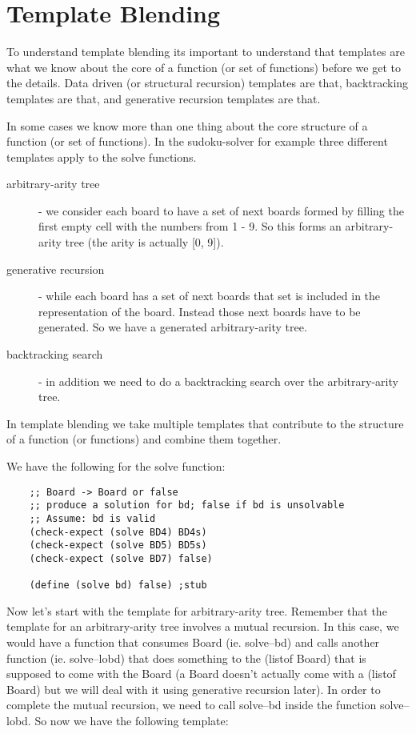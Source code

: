 \documentclass[11pt,a4paper]{report}
\begin{document}
	\chapter{Template Blending} \label{ch:temp_blend}
	To understand template blending its important to understand that templates are what we know
	about the core of a function (or set of functions) before we get to the details. Data driven (or
	structural recursion) templates are that, backtracking templates are that, and generative recursion
	templates are that.
	
	In some cases we know more than one thing about the core structure of a function (or set of
	functions). In the sudoku-solver for example three different templates apply to the solve
	functions.
	\begin{description}
		\item[arbitrary-arity tree] - we consider each board to have a set of next boards formed by filling the
		first empty cell with the numbers from 1 - 9. So this forms an arbitrary-arity tree (the arity is
		actually [0, 9]).
		\item[generative recursion] - while each board has a set of next boards that set is included in the
		representation of the board. Instead those next boards have to be generated. So we have a
		generated arbitrary-arity tree.
		\item[backtracking search] - in addition we need to do a backtracking search over the arbitrary-arity
		tree.
	\end{description}

	In template blending we take multiple templates that contribute to the structure of a function (or
	functions) and combine them together.
	
	We have the following for the solve function:
	
	\begin{verbatim}
	;; Board -> Board or false
	;; produce a solution for bd; false if bd is unsolvable
	;; Assume: bd is valid
	(check-expect (solve BD4) BD4s)
	(check-expect (solve BD5) BD5s)
	(check-expect (solve BD7) false)
	
	(define (solve bd) false) ;stub
	\end{verbatim}
	
	Now let's start with the template for arbitrary-arity tree. Remember that the template for an
	arbitrary-arity tree involves a mutual recursion. In this case, we would have a function that
	consumes Board (ie. solve--bd) and calls another function (ie. solve--lobd) that does
	something to the (listof Board) that is supposed to come with the Board (a Board doesn't actually
	come with a (listof Board) but we will deal with it using generative recursion later). In order to
	complete the mutual recursion, we need to call solve--bd inside the function solve--lobd. So
	now we have the following template:
	
\end{document}
